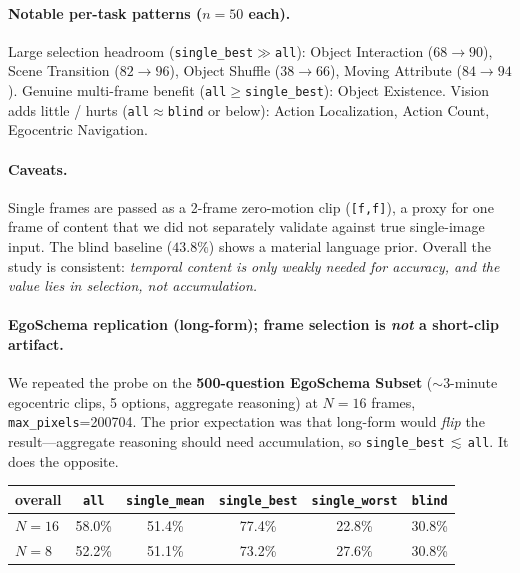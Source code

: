 \documentclass[11pt]{article}
\begin{document}
\paragraph{Notable per-task patterns ($n=50$ each).} Large selection headroom
(\texttt{single\_best}$\gg$\texttt{all}): Object Interaction ($68\!\to\!90$), Scene
Transition ($82\!\to\!96$), Object Shuffle ($38\!\to\!66$), Moving Attribute
($84\!\to\!94$). Genuine multi-frame benefit (\texttt{all}$\ge$\texttt{single\_best}):
Object Existence. Vision adds little / hurts (\texttt{all}$\approx$\texttt{blind} or
below): Action Localization, Action Count, Egocentric Navigation.

\paragraph{Caveats.} Single frames are passed as a 2-frame zero-motion clip
(\texttt{[f,f]}), a proxy for one frame of content that we did not separately
validate against true single-image input. The blind baseline ($43.8\%$) shows a
material language prior. Overall the study is consistent: \emph{temporal content is
only weakly needed for accuracy, and the value lies in selection, not accumulation.}

\paragraph{EgoSchema replication (long-form); frame selection is \emph{not} a short-clip
artifact.} We repeated the probe on the \textbf{500-question EgoSchema Subset}
($\sim$3-minute egocentric clips, 5 options, aggregate reasoning) at $N{=}16$ frames,
\texttt{max\_pixels}=200704. The prior expectation was that long-form would \emph{flip}
the result---aggregate reasoning should need accumulation, so
\texttt{single\_best}$\,\lesssim\,$\texttt{all}. It does the opposite.

\begin{center}
\begin{tabular}{lccccc}
\toprule
overall & \texttt{all} & \texttt{single\_mean} & \texttt{single\_best} & \texttt{single\_worst} & \texttt{blind} \\
\midrule
$N{=}16$ & 58.0\% & 51.4\% & 77.4\% & 22.8\% & 30.8\% \\
$N{=}8$  & 52.2\% & 51.1\% & 73.2\% & 27.6\% & 30.8\% \\
\bottomrule
\end{tabular}
\end{center}
\end{document}
